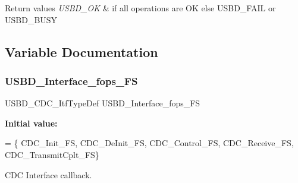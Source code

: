\begin{DoxyRetVals}{Return values}
{\em U\+S\+B\+D\+\_\+\+OK} & if all operations are OK else U\+S\+B\+D\+\_\+\+F\+A\+IL or U\+S\+B\+D\+\_\+\+B\+U\+SY \\
\hline
\end{DoxyRetVals}


\subsection{Variable Documentation}
\mbox{\label{group__USBD__CDC__IF_ga99394ed19b774f171df96c2848c411ed}} 
\subsubsection{\texorpdfstring{U\+S\+B\+D\+\_\+\+Interface\+\_\+fops\+\_\+\+FS}{USBD\_Interface\_fops\_FS}}
{\footnotesize\ttfamily U\+S\+B\+D\+\_\+\+C\+D\+C\+\_\+\+Itf\+Type\+Def U\+S\+B\+D\+\_\+\+Interface\+\_\+fops\+\_\+\+FS}

{\bfseries Initial value\+:}
\begin{DoxyCode}
=
    \{
        CDC\_Init\_FS,
        CDC\_DeInit\_FS,
        CDC\_Control\_FS,
        CDC\_Receive\_FS,
        CDC\_TransmitCplt\_FS\}
\end{DoxyCode}
C\+DC Interface callback. 